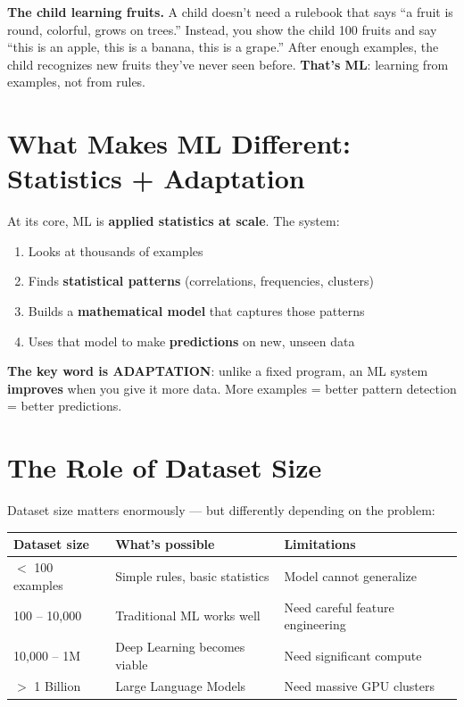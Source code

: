 \documentclass[11pt,a4paper]{report}
\begin{document}
\begin{analogybox}
\textbf{The child learning fruits.} A child doesn't need a rulebook that says ``a fruit is round, colorful, grows on trees.'' Instead, you show the child 100 fruits and say ``this is an apple, this is a banana, this is a grape.'' After enough examples, the child recognizes new fruits they've never seen before. \textbf{That's ML}: learning from examples, not from rules.
\end{analogybox}

\section{What Makes ML Different: Statistics + Adaptation}

At its core, ML is \textbf{applied statistics at scale}. The system:

\begin{enumerate}
    \item Looks at thousands of examples
    \item Finds \textbf{statistical patterns} (correlations, frequencies, clusters)
    \item Builds a \textbf{mathematical model} that captures those patterns
    \item Uses that model to make \textbf{predictions} on new, unseen data
\end{enumerate}

\textbf{The key word is ADAPTATION}: unlike a fixed program, an ML system \textbf{improves} when you give it more data. More examples = better pattern detection = better predictions.

\section{The Role of Dataset Size}

Dataset size matters enormously --- but differently depending on the problem:

\begin{table}[h]
\centering
\begin{tabularx}{\textwidth}{l X X}
\toprule
\textbf{Dataset size} & \textbf{What's possible} & \textbf{Limitations} \\
\midrule
$<$ 100 examples & Simple rules, basic statistics & Model cannot generalize \\
100 -- 10,000 & Traditional ML works well & Need careful feature engineering \\
10,000 -- 1M & Deep Learning becomes viable & Need significant compute \\
$>$ 1 Billion & Large Language Models & Need massive GPU clusters \\
\bottomrule
\end{tabularx}
\end{table}
\end{document}
